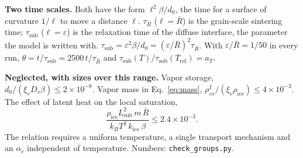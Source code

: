 \documentclass[11pt]{article}
\newcommand{\ice}{\mathrm{ice}}
\newcommand{\Rbar}{\bar R}
\newcommand{\rvs}{\rho_{vs}^{I}}
\begin{document}
\textbf{Two time scales.} Both have the form $\ell^{2}\beta/d_0$, the time for
a surface of curvature $1/\ell$ to move a distance $\ell$. $\tau_{\Rbar}$
($\ell = \Rbar$) is the grain-scale sintering time; $\tau_{\mathrm{sub}}$
($\ell = \varepsilon$) is the relaxation time of the diffuse interface, the
parameter the model is written with. $\tau_{\mathrm{sub}} =
\varepsilon^{2}\beta/d_0 = (\varepsilon/\Rbar)^{2}\tau_{\Rbar}$. With
$\varepsilon/\Rbar = 1/50$ in every run, $\theta = t/\tau_{\mathrm{sub}} =
2500\,t/\tau_{\Rbar}$ and $\tau_{\mathrm{sub}}(T)/\tau_{\mathrm{sub}}(T_{\mathrm{ref}})
= a_T$.

\textbf{Neglected, with sizes over this range.} Vapor storage,
$d_0/(\xi_v D_v\beta) \le 2\times10^{-8}$. Vapor mass in
Eq.~\eqref{eq:mass}, $\rvs/(\xi_v\rho_\ice) \le 4\times10^{-3}$. The effect
of latent heat on the local saturation,
\[
\frac{\rho_\ice L_{\mathrm{sub}}^{2}\,m\,\Rbar}{k_B T^{2}\,k_\ice\,\beta} \le 2.4\times10^{-3} .
\]
The relation requires a uniform temperature, a single transport mechanism
and an $\alpha_c$ independent of temperature. Numbers:
\texttt{check\_groups.py}.
\end{document}
